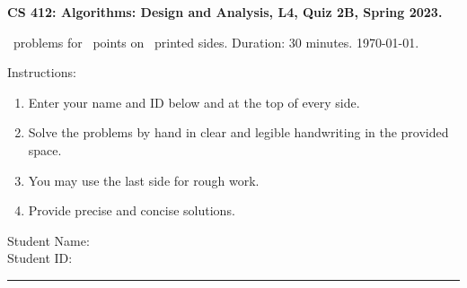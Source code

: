 \documentclass[addpoints,a4paper]{exam}
\begin{document}
\begin{flushleft}
  { \large \textsf{\textbf{CS 412: Algorithms: Design and Analysis, L4, Quiz 2B, Spring 2023.}}}\vspace{.5em}
  
  \numquestions\ problems for \numpoints\ points on \numpages\ printed sides. Duration: 30 minutes. \today.
\end{flushleft}

Instructions:
\begin{enumerate}
\item Enter your name and ID below and at the top of every side.
\item Solve the problems by hand in clear and legible handwriting in the provided space.
\item You may use the last side for rough work.
\item Provide precise and concise solutions.
\end{enumerate}

\noindent Student Name: \hrulefill \\[5pt]
\noindent Student ID: \hrulefill \\
\rule{\textwidth}{1pt}
  
\end{document}

